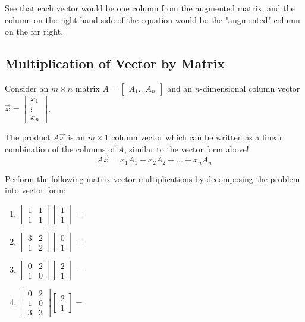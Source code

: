\documentclass[11pt]{exam}
\begin{document}
        See that each vector would be one column from the augmented matrix, and the column on the right-hand side of the equation
        would be the "augmented" column on the far right.

    \vspace{20px}
    \subsection{Multiplication of Vector by Matrix}
        Consider an $m \times n$ matrix $A = \begin{bmatrix} A_1 \dots A_n \end{bmatrix}$
        and an $n$-dimensional column vector $\vec{x} = \begin{bmatrix} x_1 \\ \vdots \\ x_n \end{bmatrix}$.

        The product $A \vec{x}$ is an $m \times 1$ column vector which can be written as a linear combination of the columns of $A$, similar
        to the vector form above!
        $$A \vec{x} = x_1A_1 + x_2A_2 + \dots + x_nA_n$$

        \pagebreak
        \begin{questions}
            \item Perform the following matrix-vector multiplications by decomposing the problem into vector form:
            \begin{enumerate}
                \item $\begin{bmatrix} 1 & 1 \\ 1 & 1 \end{bmatrix} \begin{bmatrix} 1 \\ 1 \end{bmatrix} =$
                \item $\begin{bmatrix} 3 & 2 \\ 1 & 2 \end{bmatrix} \begin{bmatrix} 0 \\ 1 \end{bmatrix} =$
                \item $\begin{bmatrix} 0 & 2 \\ 1 & 0 \end{bmatrix} \begin{bmatrix} 2 \\ 1 \end{bmatrix} =$
                \item $\begin{bmatrix} 0 & 2 \\ 1 & 0 \\ 3 & 3 \end{bmatrix} \begin{bmatrix} 2 \\ 1 \end{bmatrix} =$
            \end{enumerate}
        \end{questions}
\end{document}
